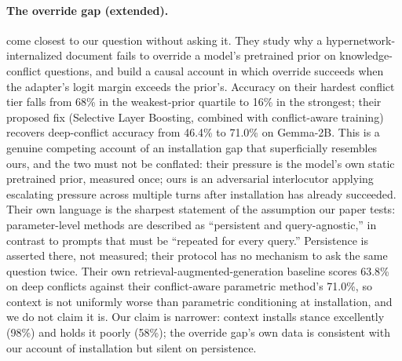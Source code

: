 \paragraph{The override gap (extended).} \citet{cheng2026overridegap} come closest to
our question without asking it. They study why a hypernetwork-internalized document
fails to override a model's pretrained prior on knowledge-conflict questions, and build
a causal account in which override succeeds when the adapter's logit margin exceeds the
prior's. Accuracy on their hardest conflict tier falls from 68\% in the weakest-prior
quartile to 16\% in the strongest; their proposed fix (Selective Layer Boosting,
combined with conflict-aware training) recovers deep-conflict accuracy from 46.4\% to
71.0\% on Gemma-2B. This is a genuine competing account of an installation gap that
superficially resembles ours, and the two must not be conflated: their pressure is the
model's own static pretrained prior, measured once; ours is an adversarial interlocutor
applying escalating pressure across multiple turns after installation has already
succeeded. Their own language is the sharpest statement of the assumption our paper
tests: parameter-level methods are described as ``persistent and query-agnostic,'' in
contrast to prompts that must be ``repeated for every query.'' Persistence is asserted
there, not measured; their protocol has no mechanism to ask the same question twice.
Their own retrieval-augmented-generation baseline scores 63.8\% on deep conflicts
against their conflict-aware parametric method's 71.0\%, so context is not uniformly
worse than parametric conditioning at installation, and we do not claim it is. Our claim
is narrower: context installs stance excellently (98\%) and holds it poorly (58\%); the
override gap's own data is consistent with our account of installation but silent on
persistence.

